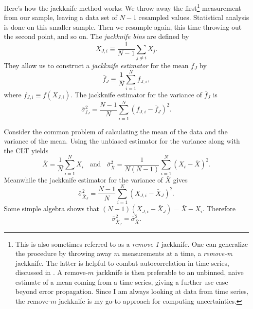 Here's how the jackknife method works: We throw away the 
first\footnote{This is also sometimes referred to as a
{\it remove-1} jackknife. One can generalize the procedure by throwing
away $m$ measurements at a time, a {\it remove-m} jackknife. The latter
is helpful to combat autocorrelation in time series, discussed in
. A remove-$m$ jackknife is then preferable
to an unbinned, naive estimate of a mean coming from a time series, giving
a further use case beyond error propagation. Since I am always looking
at data from time series, the remove-$m$ jackknife is my go-to approach
for computing uncertainties.} measurement 
from our sample, leaving a data set of $N-1$ resampled values. Statistical
analysis is done on this smaller sample. Then we resample again, this time
throwing out the second point, and so on.
The {\it jackknife bins} are defined by
\begin{equation}
  X_{J,i}\equiv\frac{1}{N-1}\sum_{j\neq i}X_j.
\end{equation}
They allow us to construct a {\it jackknife estimator}
 for the mean $\bar{f}_J$ by
\begin{equation}\label{eq:jackmean}
  \bar{f}_J\equiv\frac{1}{N}\sum_{i=1}^N f_{J,i},
\end{equation}
where $f_{J,i}\equiv f(X_{J,i})$. The jackknife estimator for the 
variance of $\bar{f}_J$ is
\begin{equation}\label{eq:jackvar}
  \bar\sigma^2_{f_J}=\frac{N-1}{N}\sum_{i=1}^N(f_{J,i}-\bar{f}_J)^2.
\end{equation}
\begin{example*}{}{}
  Consider the common problem of calculating the mean of the data and
  the variance of the mean. Using the unbiased estimator for the variance
  along with the CLT yields
  \begin{equation}
    \bar{X}=\frac{1}{N}\sum_{i=1}^N X_i~~~~\text{and}~~~~
     \bar{\sigma}^2_{\bar{X}}=\frac{1}{N(N-1)}\sum_{i=1}^N(X_i-\bar{X})^2.
  \end{equation}
  Meanwhile the jackknife estimator for the variance of $\bar{X}$ gives
  \begin{equation}
    \bar\sigma_{\bar{X}_J}^2=\frac{N-1}{N}\sum_{i=1}^N(X_{J,i}-\bar{X}_J)^2.
  \end{equation}
  Some simple algebra shows that $(N-1)(X_{J,i}-\bar{X}_J)=\bar{X}-X_i$.
  Therefore
  \begin{equation}
    \bar\sigma_{\bar{X}_J}^2=\bar{\sigma}^2_{\bar{X}}.
  \end{equation}
\end{example*}

